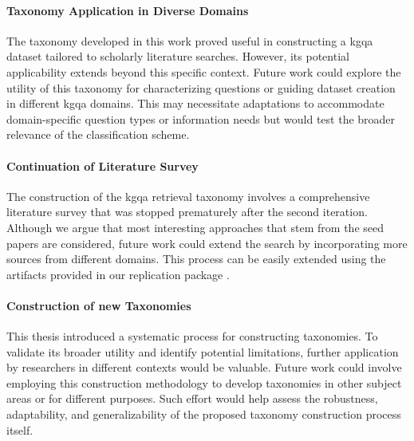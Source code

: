\paragraph{Taxonomy Application in Diverse Domains} The taxonomy developed in this work proved useful in constructing a \gls{kgqa} dataset tailored to scholarly literature searches. However, its potential applicability extends beyond this specific context. Future work could explore the utility of this taxonomy for characterizing questions or guiding dataset creation in different \gls{kgqa} domains. This may necessitate adaptations to accommodate domain-specific question types or information needs but would test the broader relevance of the classification scheme.

\paragraph{Continuation of Literature Survey} The construction of the \gls{kgqa} retrieval taxonomy involves a comprehensive literature survey that was stopped prematurely after the second iteration. Although we argue that most interesting approaches that stem from the seed papers are considered, future work could extend the search by incorporating more sources from different domains. This process can be easily extended using the artifacts provided in our replication package \cite{schneider_replication_2025}.

\paragraph{Construction of new Taxonomies} This thesis introduced a systematic process for constructing taxonomies. To validate its broader utility and identify potential limitations, further application by researchers in different contexts would be valuable. Future work could involve employing this construction methodology to develop taxonomies in other subject areas or for different purposes. Such effort would help assess the robustness, adaptability, and generalizability of the proposed taxonomy construction process itself.


